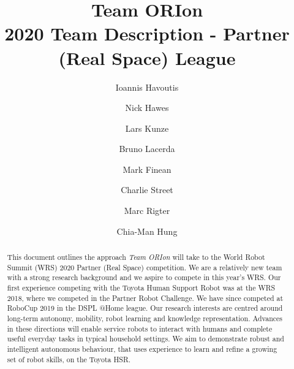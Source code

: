 \documentclass[runningheads,a4paper]{llncs}
\newcommand{\teamori}{Team ORIon}
\begin{document}

\title{\teamori\\ 2020 Team Description - Partner (Real Space) League}

\author{Ioannis Havoutis \and Nick Hawes \and Lars Kunze \and Bruno Lacerda 
\and Mark Finean \and Charlie Street \and Marc Rigter \and Chia-Man Hung}

\maketitle


\begin{abstract}
This document outlines the approach \textit{\teamori} will take to the 
World Robot Summit (WRS) 2020 Partner (Real Space) competition. 
We are a relatively new team with a strong research background and we aspire to compete 
in this year's WRS. Our first experience competing with the Toyota Human 
Support Robot was at the WRS 2018, where we competed in the Partner 
Robot Challenge. We have since competed at RoboCup 2019 in the DSPL @Home league.
Our research interests are centred around long-term
autonomy, mobility, robot learning and knowledge representation. 
Advances in these directions will enable service robots to interact with humans
and complete useful everyday tasks in typical household settings. 
We aim to demonstrate robust and intelligent autonomous behaviour, that uses
experience to learn and refine a growing set of robot skills, on the Toyota
HSR.
\end{abstract}



\end{document}
